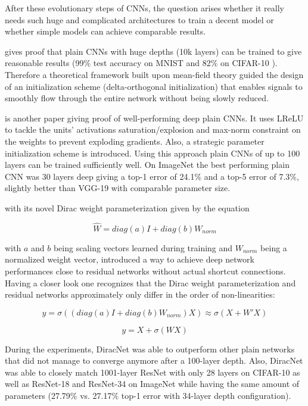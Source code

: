 After these evolutionary steps of CNNs, the question arises whether it really needs such huge and complicated architectures to train a decent model or whether simple models can achieve comparable results. 

\cite{LechaoXiao.2018} gives proof that plain CNNs with huge depths (10k layers) can be trained to give reasonable results (99\% test accuracy on MNIST \cite{YannLeCun.1998} and 82\% on CIFAR-10 \cite{AlexKrizhevsky.2009}). Therefore a theoretical framework built upon mean-field theory guided the design of an initialization scheme (delta-orthogonal initialization) that enables signals to smoothly flow through the entire network without being slowly reduced. \cite{LechaoXiao.2018} 

\cite{OyebadeOyedotun.2020} is another paper giving proof of well-performing deep plain CNNs. It uses LReLU to tackle the units' activations saturation/explosion and max-norm constraint on the weights to prevent exploding gradients. Also, a strategic parameter initialization scheme is introduced. Using this approach plain CNNs of up to 100 layers can be trained sufficiently well. On ImageNet \cite{JiaDeng.2009} the best performing plain CNN was 30 layers deep giving a top-1 error of 24.1\% and a top-5 error of 7.3\%, slightly better than VGG-19 with comparable parameter size. \cite{OyebadeOyedotun.2020}

\cite{SergeyZagoruyko.2018} with its novel Dirac weight parameterization given by the equation 

\begin{equation}
	\hat{W} = diag(a)I + diag(b)W_{norm}
\end{equation}

with $a$ and $b$ being scaling vectors learned during training and $W_{norm}$ being a normalized weight vector, introduced a way to achieve deep network performances close to residual networks without actual shortcut connections. Having a closer look one recognizes that the Dirac weight parameterization and residual networks approximately only differ in the order of non-linearities:

\begin{equation}
	y = \sigma((diag(a)I + diag(b)W_{norm}) X) \approx \sigma(X + W'X)
\end{equation}

\begin{equation}
	y = X + \sigma(WX)
\end{equation}

During the experiments, DiracNet was able to outperform other plain networks that did not manage to converge anymore after a 100-layer depth. Also, DiracNet was able to closely match 1001-layer ResNet with only 28 layers on CIFAR-10 \cite{AlexKrizhevsky.2009} as well as ResNet-18 and ResNet-34 on ImageNet while having the same amount of parameters (27.79\% vs. 27.17\% top-1 error with 34-layer depth configuration). \cite{SergeyZagoruyko.2018}

